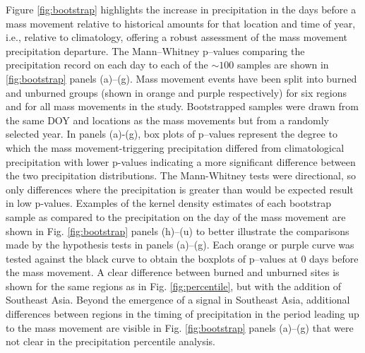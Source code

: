 \documentclass[nhess, manuscript]{copernicus}
\begin{document}
Figure \ref{fig:bootstrap} highlights the increase in precipitation in the
days before a mass movement relative to historical amounts for that location
and time of year, i.e., relative to climatology, offering a robust
assessment of the mass movement precipitation departure. The Mann--Whitney 
p--values comparing the precipitation record on each day to each of the \(\sim100\) 
samples are shown in \ref{fig:bootstrap} panels (a)--(g). Mass movement events have 
been split into burned and unburned groups (shown in orange and purple respectively) 
for six regions and for all mass movements in the study. Bootstrapped samples were 
drawn from the same DOY and locations as the mass movements but from a randomly 
selected year. In panels (a)-(g), box plots of p–values represent the degree to 
which the mass movement-triggering precipitation differed from climatological 
precipitation with lower p-values indicating a more significant difference between 
the two precipitation distributions. The Mann-Whitney tests were directional, so 
only differences where the precipitation is greater than would be expected result 
in low p-values. Examples of the kernel 
density estimates of each bootstrap sample as compared to the precipitation on the 
day of the mass movement are shown in Fig. \ref{fig:bootstrap} panels (h)--(u) to better 
illustrate the comparisons made by the hypothesis tests  in panels (a)--(g). Each 
orange or purple curve was tested against the black curve to obtain the boxplots of 
p--values at 0 days before the mass movement. A clear difference
between burned and unburned sites is shown for the same regions as in
Fig. \ref{fig:percentile}, but with the addition of Southeast Asia.
Beyond the emergence of a signal in Southeast Asia, additional
differences between regions in the timing of precipitation in the period
leading up to the mass movement are visible in Fig. \ref{fig:bootstrap} panels (a)--(g) that
were not clear in the precipitation percentile analysis.
\end{document}
